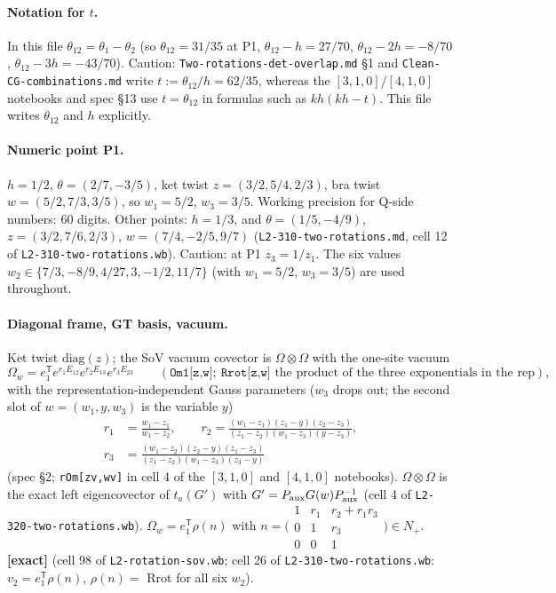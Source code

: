 \documentclass[11pt]{article}
\newcommand{\Om}{\Omega}
\newcommand{\eT}{e_1^{\mathsf T}}
\newcommand{\thh}{\theta_{12}}
\newcommand{\ex}{\textbf{[exact]}}
\newcommand{\nb}[1]{\texttt{#1}}
\begin{document}
\paragraph{Notation for $t$.} In this file $\thh=\theta_1-\theta_2$ (so $\thh=31/35$ at P1, $\thh-h=27/70$, $\thh-2h=-8/70$, $\thh-3h=-43/70$). Caution: \nb{Two-rotations-det-overlap.md} \S1 and \nb{Clean-CG-combinations.md} write $t:=\theta_{12}/h=62/35$, whereas the $[3,1,0]$/$[4,1,0]$ notebooks and spec \S13 use $t=\theta_{12}$ in formulas such as $kh(kh-t)$. This file writes $\thh$ and $h$ explicitly.

\paragraph{Numeric point P1.} $h=1/2$, $\theta=(2/7,-3/5)$, ket twist $z=(3/2,5/4,2/3)$, bra twist $w=(5/2,7/3,3/5)$, so $w_1=5/2$, $w_3=3/5$. Working precision for Q-side numbers: 60 digits. Other points: $h=1/3$, and $\theta=(1/5,-4/9)$, $z=(3/2,7/6,2/3)$, $w=(7/4,-2/5,9/7)$ (\nb{L2-310-two-rotations.md}, cell 12 of \nb{L2-310-two-rotations.wb}). Caution: at P1 $z_3=1/z_1$. The six values $w_2\in\{7/3,-8/9,4/27,3,-1/2,11/7\}$ (with $w_1=5/2$, $w_3=3/5$) are used throughout.

\paragraph{Diagonal frame, GT basis, vacuum.} Ket twist $\mathrm{diag}(z)$; the SoV vacuum covector is $\Om\otimes\Om$ with the one-site vacuum
\[
\Om_w=\eT e^{r_1E_{12}}e^{r_2E_{13}}e^{r_3E_{23}}\qquad(\texttt{Om1[z,w]};\ \texttt{Rrot[z,w]}\text{ the product of the three exponentials in the rep}),
\]
with the representation-independent Gauss parameters ($w_3$ drops out; the second slot of $w=(w_1,y,w_3)$ is the variable $y$)
\begin{align}
r_1&=\frac{w_1-z_1}{w_1-z_2},\qquad
r_2=\frac{(w_1-z_1)(z_1-y)(z_2-z_3)}{(z_1-z_2)(w_1-z_3)(y-z_3)},\nonumber\\
r_3&=\frac{(w_1-z_2)(z_2-y)(z_1-z_3)}{(z_1-z_2)(w_1-z_3)(z_3-y)}
\end{align}
(spec \S2; \nb{rOm[zv,wv]} in cell 4 of the $[3,1,0]$ and $[4,1,0]$ notebooks). $\Om\otimes\Om$ is the exact left eigencovector of $t_a(G')$ with $G'=P_{\rm aux}G(w)P_{\rm aux}^{-1}$ (cell 4 of \nb{L2-320-two-rotations.wb}). $\Om_w=\eT\rho(n)$ with $n=\bigl(\begin{smallmatrix}1&r_1&r_2+r_1r_3\\0&1&r_3\\0&0&1\end{smallmatrix}\bigr)\in N_+$. \ex{} (cell 98 of \nb{L2-rotation-sov.wb}; cell 26 of \nb{L2-310-two-rotations.wb}: $v_2=\eT\rho(n)$, $\rho(n)=$ Rrot for all six $w_2$).
\end{document}
